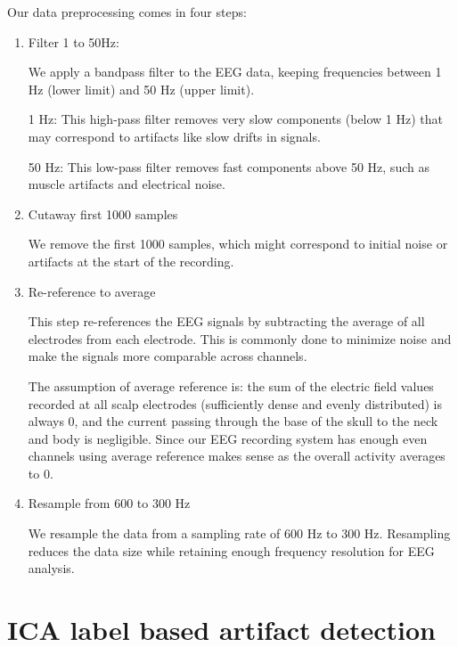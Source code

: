 \documentclass[12pt,a4paper,titlepage,openany]{report}
\begin{document}
Our data preprocessing comes in four steps:
\begin{enumerate}
    \item Filter 1 to 50Hz:
    
    We apply a bandpass filter to the EEG data, keeping frequencies between 1 Hz (lower limit) and 50 Hz (upper limit).

    1 Hz: This high-pass filter removes very slow components (below 1 Hz) that may correspond to artifacts like slow drifts in signals.

    50 Hz: This low-pass filter removes fast components above 50 Hz, such as muscle artifacts and electrical noise.

    \item Cutaway first 1000 samples

    We remove the first 1000 samples, which might correspond to initial noise or artifacts at the start of the recording. 

    \item Re-reference to average

    This step re-references the EEG signals by subtracting the average of all electrodes from each electrode. This is commonly done to minimize noise and make the signals more comparable across channels.

    The assumption of average reference is: the sum of the electric field values recorded at all scalp electrodes (sufficiently dense and evenly distributed) is always 0, and the current passing through the base of the skull to the neck and body is negligible. 
    Since our EEG recording system has enough even channels using average reference makes sense as the overall activity averages to 0.

    \item Resample from 600 to 300 Hz

    We resample the data from a sampling rate of 600 Hz to 300 Hz. Resampling reduces the data size while retaining enough frequency resolution for EEG analysis.

\end{enumerate}

\section{ICA label based artifact detection}
\end{document}
